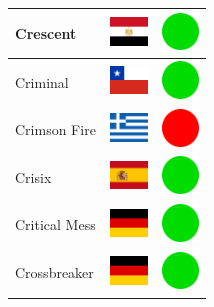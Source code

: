 \documentclass[12pt, a4paper, twoside]{report}
\begin{document}
\begin{center}
\begin{longtable}{|p{5cm}|p{2cm}|p{2cm}|}
 Crescent                                                   & \includegraphics[width=1cm]{../4x3/eg} &   \includegraphics[width=1cm]{../likes/y} \\ \hline
 Criminal                                                   & \includegraphics[width=1cm]{../4x3/cl} &   \includegraphics[width=1cm]{../likes/y} \\ \hline
 Crimson Fire                                               & \includegraphics[width=1cm]{../4x3/gr} &   \includegraphics[width=1cm]{../likes/n} \\ \hline
 Crisix                                                     & \includegraphics[width=1cm]{../4x3/es} &   \includegraphics[width=1cm]{../likes/y} \\ \hline
 Critical Mess                                              & \includegraphics[width=1cm]{../4x3/de} &   \includegraphics[width=1cm]{../likes/y} \\ \hline
 Crossbreaker                                               & \includegraphics[width=1cm]{../4x3/de} &   \includegraphics[width=1cm]{../likes/y} \\ \hline

\end{longtable}
\end{center}
\end{document}
